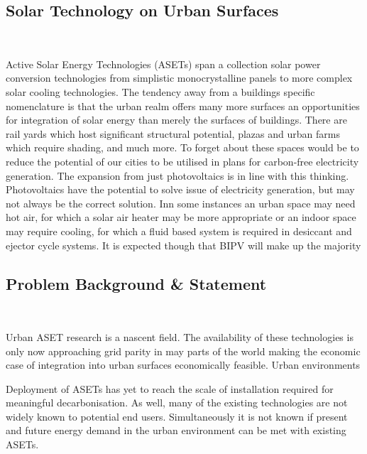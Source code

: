 \vspace{2cm}


\subsection{Solar Technology on Urban Surfaces}\
\vspace{2cm}

Active Solar Energy Technologies (ASETs) span a collection solar power conversion technologies from simplistic monocrystalline panels to more complex solar cooling technologies. The tendency away from a buildings specific nomenclature is that the urban realm offers many more surfaces an opportunities for integration of solar energy than merely the surfaces of buildings. There are rail yards which host significant structural potential, plazas and urban farms which require shading, and much more. To forget about these spaces would be to reduce the potential of our cities to be utilised in plans for carbon-free electricity generation. The expansion from just photovoltaics is in line with this thinking. Photovoltaics have the potential to solve issue of electricity generation, but may not always be the correct solution. Inn some instances an urban space may need hot air, for which a solar air heater may be more appropriate or an indoor space may require cooling, for which a fluid based system is required in desiccant and ejector cycle systems. It is expected though that BIPV will make up the majority 

\subsection{Problem Background \& Statement}\

Urban ASET research is a nascent field. The availability of these technologies is only now approaching grid parity in may parts of the world making the economic case of integration into urban surfaces economically feasible. Urban environments 

Deployment of ASETs has yet to reach the scale of installation required for meaningful decarbonisation. As well, many of the existing technologies are not widely known to potential end users. Simultaneously it is not known if present and future energy demand in the urban environment can be met with existing ASETs. 

